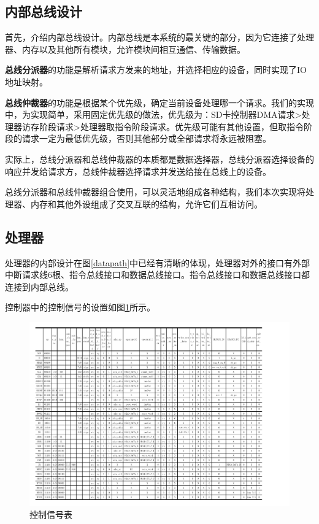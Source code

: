 \documentclass[11pt,utf8]{report}
\begin{document}
\subsection{内部总线设计}
	\par 首先，介绍内部总线设计。内部总线是本系统的最关键的部分，因为它连接了处理器、内存以及其他所有模块，允许模块间相互通信、传输数据。
	\par \textbf{总线分派器}的功能是解析请求方发来的地址，并选择相应的设备，同时实现了IO地址映射。
	\par \textbf{总线仲裁器}的功能是根据某个优先级，确定当前设备处理哪一个请求。我们的实现中，为实现简单，采用固定优先级的做法，优先级为：SD卡控制器DMA请求>处理器访存阶段请求>处理器取指令阶段请求。优先级可能有其他设置，但取指令阶段的请求一定为最低优先级，否则其他部分或全部请求将永远被阻塞。
	\par 实际上，总线分派器和总线仲裁器的本质都是数据选择器，总线分派器选择设备的响应并发给请求方，总线仲裁器选择请求并发送给接在总线上的设备。
	\par 总线分派器和总线仲裁器组合使用，可以灵活地组成各种结构，我们本次实现将处理器、内存和其他外设组成了交叉互联的结构，允许它们互相访问。

\subsection{处理器}
	\par 处理器的内部设计在图\ref{datapath}中已经有清晰的体现，处理器对外的接口有外部中断请求线6根、指令总线接口和数据总线接口。指令总线接口和数据总线接口都连接到内部总线。
	
	\par 控制器中的控制信号的设置如图\ref{control}所示。	
	
	\begin{center}
	\begin{figure}[H]
			\centering
			\setlength{\leftskip}{-40pt}
			\includegraphics[width=1.2\textwidth]{control.pdf}
			\caption{控制信号表}
			\label{control}
		\end{figure}
	\end{center}
\end{document}
